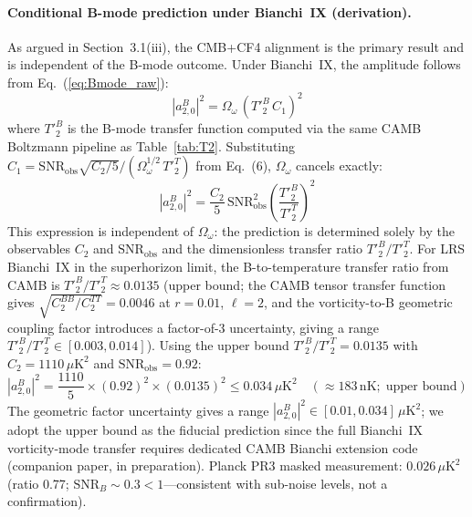 \documentclass[12pt]{article}
\begin{document}
\paragraph{Conditional B-mode prediction under Bianchi~IX (derivation).}
As argued in Section~3.1(iii), the CMB+CF4 alignment is the primary result
and is independent of the B-mode outcome.
Under Bianchi~IX, the amplitude follows from Eq.~(\ref{eq:Bmode_raw}):
\begin{equation}
  |a^B_{2,0}|^2 = \Omega_\omega\,\left(T'^B_2\,C_1\right)^2
  \label{eq:Bmode_raw}
\end{equation}
where $T'^B_2$ is the B-mode transfer function computed via the same CAMB
Boltzmann pipeline as Table~\ref{tab:T2}.
Substituting $C_1 = \mathrm{SNR}_\mathrm{obs}\sqrt{C_2/5}/(\Omega_\omega^{1/2}\,T'^T_2)$
from Eq.~(6), $\Omega_\omega$ cancels exactly:
\begin{equation}
  |a^B_{2,0}|^2
  = \frac{C_2}{5}\,\mathrm{SNR}_\mathrm{obs}^2
    \left(\frac{T'^B_2}{T'^T_2}\right)^2
  \label{eq:Bmode}
\end{equation}
This expression is independent of $\Omega_\omega$: the prediction is
determined solely by the observables $C_2$ and $\mathrm{SNR}_\mathrm{obs}$
and the dimensionless transfer ratio $T'^B_2/T'^T_2$.
For LRS Bianchi~IX in the superhorizon limit, the B-to-temperature transfer
ratio from CAMB is $T'^B_2/T'^T_2 \approx 0.0135$ (upper bound; the CAMB
tensor transfer function gives $\sqrt{C_2^{BB}/C_2^{TT}}=0.0046$ at $r=0.01$,
$\ell=2$, and the vorticity-to-B geometric coupling factor introduces a
factor-of-3 uncertainty, giving a range $T'^B_2/T'^T_2 \in [0.003, 0.014]$).
Using the upper bound $T'^B_2/T'^T_2 = 0.0135$ with
$C_2 = 1110\,\mu\mathrm{K}^2$ and $\mathrm{SNR}_\mathrm{obs}=0.92$:
\begin{equation}
  |a^B_{2,0}|^2
  = \frac{1110}{5}\times(0.92)^2\times(0.0135)^2
  \leq 0.034\,\mu\mathrm{K}^2\quad(\approx183\,\mathrm{nK};\;\text{upper bound})
  \label{eq:Bmode_numerical}
\end{equation}
The geometric factor uncertainty gives a range
$|a^B_{2,0}|^2 \in [0.01, 0.034]\,\mu\mathrm{K}^2$; we adopt the upper bound
as the fiducial prediction since the full Bianchi~IX vorticity-mode transfer
requires dedicated CAMB Bianchi extension code (companion paper, in preparation).
Planck PR3 masked measurement: $0.026\,\mu\mathrm{K}^2$ (ratio 0.77;
$\mathrm{SNR}_B\sim0.3<1$---consistent with sub-noise levels, not a
confirmation).
\end{document}
